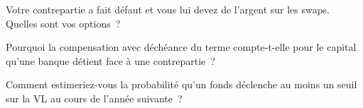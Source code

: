 \begin{interviewq}\label{iq:fm:legal-documentation:4}
Votre contrepartie a fait défaut et vous lui devez de l'argent sur les swaps. Quelles sont vos options~?
\end{interviewq}

\begin{interviewq}\label{iq:fm:legal-documentation:5}
Pourquoi la compensation avec déchéance du terme compte-t-elle pour le capital qu'une banque détient face à une contrepartie~?
\end{interviewq}

\begin{interviewq}\label{iq:fm:legal-documentation:6}
Comment estimeriez-vous la probabilité qu'un fonds déclenche au moins un seuil sur la VL au cours de l'année suivante~?
\end{interviewq}
